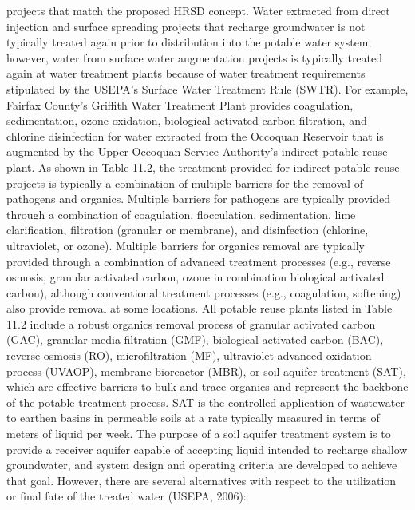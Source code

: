 \documentclass{article}
\begin{document}
projects that match the proposed HRSD concept. Water extracted from
direct injection and surface spreading projects that recharge
groundwater is not typically treated again prior to distribution into
the potable water system; however, water from surface water augmentation
projects is typically treated again at water treatment plants because of
water treatment requirements stipulated by the USEPA's Surface Water
Treatment Rule (SWTR). For example, Fairfax County's Griffith Water
Treatment Plant provides coagulation, sedimentation, ozone oxidation,
biological activated carbon filtration, and chlorine disinfection for
water extracted from the Occoquan Reservoir that is augmented by the
Upper Occoquan Service Authority's indirect potable reuse plant. As
shown in Table 11.2, the treatment provided for indirect potable reuse
projects is typically a combination of multiple barriers for the removal
of pathogens and organics. Multiple barriers for pathogens are typically
provided through a combination of coagulation, flocculation,
sedimentation, lime clarification, filtration (granular or membrane),
and disinfection (chlorine, ultraviolet, or ozone). Multiple barriers
for organics removal are typically provided through a combination of
advanced treatment processes (e.g., reverse osmosis, granular activated
carbon, ozone in combination biological activated carbon), although
conventional treatment processes (e.g., coagulation, softening) also
provide removal at some locations. All potable reuse plants listed in
Table 11.2 include a robust organics removal process of granular
activated carbon (GAC), granular media filtration (GMF), biological
activated carbon (BAC), reverse osmosis (RO), microfiltration (MF),
ultraviolet advanced oxidation process (UVAOP), membrane bioreactor
(MBR), or soil aquifer treatment (SAT), which are effective barriers to
bulk and trace organics and represent the backbone of the potable
treatment process. SAT is the controlled application of wastewater to
earthen basins in permeable soils at a rate typically measured in terms
of meters of liquid per week. The purpose of a soil aquifer treatment
system is to provide a receiver aquifer capable of accepting liquid
intended to recharge shallow groundwater, and system design and
operating criteria are developed to achieve that goal. However, there
are several alternatives with respect to the utilization or final fate
of the treated water (USEPA, 2006):
\end{document}
